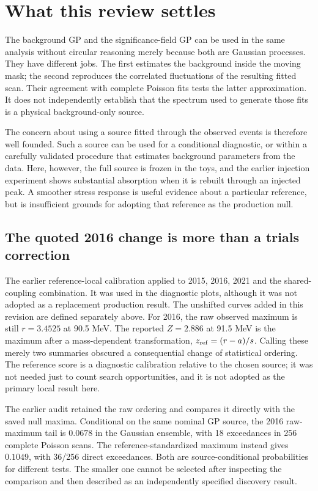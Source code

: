 \section{What this review settles}
The background GP and the significance-field GP can be used in the same analysis without circular reasoning merely because both are Gaussian processes. They have different jobs. The first estimates the background inside the moving mask; the second reproduces the correlated fluctuations of the resulting fitted scan. Their agreement with complete Poisson fits tests the latter approximation. It does not independently establish that the spectrum used to generate those fits is a physical background-only source.

The concern about using a source fitted through the observed events is therefore well founded. Such a source can be used for a conditional diagnostic, or within a carefully validated procedure that estimates background parameters from the data. Here, however, the full source is frozen in the toys, and the earlier injection experiment shows substantial absorption when it is rebuilt through an injected peak. A smoother stress response is useful evidence about a particular reference, but is insufficient grounds for adopting that reference as the production null.

\subsection{The quoted 2016 change is more than a trials correction}
The earlier reference-local calibration applied to 2015, 2016, 2021 and the shared-coupling combination. It was used in the diagnostic plots, although it was not adopted as a replacement production result. The unshifted curves added in this revision are defined separately above. For 2016, the raw observed maximum is still $r=3.4525$ at 90.5 MeV. The reported $Z=2.886$ at 91.5 MeV is the maximum after a mass-dependent transformation, $z_{\rm ref}=(r-a)/s$. Calling these merely two summaries obscured a consequential change of statistical ordering. The reference score is a diagnostic calibration relative to the chosen source; it was not needed just to count search opportunities, and it is not adopted as the primary local result here.

The earlier audit retained the raw ordering and compares it directly with the saved null maxima. Conditional on the same nominal GP source, the 2016 raw-maximum tail is $0.0678$ in the Gaussian ensemble, with 18 exceedances in 256 complete Poisson scans. The reference-standardized maximum instead gives $0.1049$, with 36/256 direct exceedances. Both are source-conditional probabilities for different tests. The smaller one cannot be selected after inspecting the comparison and then described as an independently specified discovery result.

